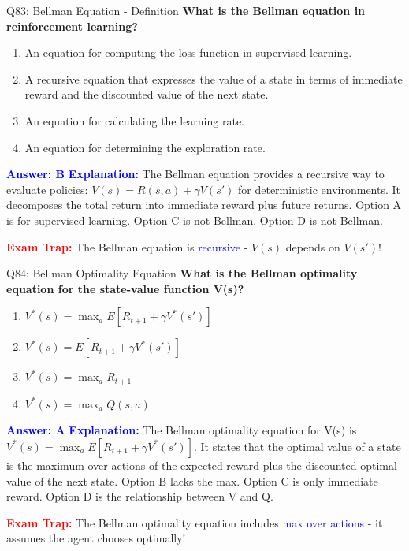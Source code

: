 \documentclass[8pt]{beamer}
\begin{document}
	\begin{frame}{Q83: Bellman Equation - Definition}
		\fontsize{6.5}{7.5}\selectfont
		\textbf{What is the Bellman equation in reinforcement learning?}
		
		\begin{enumerate}
			\item An equation for computing the loss function in supervised learning.
			\item A recursive equation that expresses the value of a state in terms of immediate reward and the discounted value of the next state.
			\item An equation for calculating the learning rate.
			\item An equation for determining the exploration rate.
		\end{enumerate}
		
		\vspace{0.1cm}
		\textcolor{blue}{\textbf{Answer: B}}
		\vspace{0.1cm}
		\textcolor{blue}{\textbf{Explanation:}} The Bellman equation provides a recursive way to evaluate policies: $V(s) = R(s,a) + \gamma V(s')$ for deterministic environments. It decomposes the total return into immediate reward plus future returns. Option A is for supervised learning. Option C is not Bellman. Option D is not Bellman.
		
		\textcolor{red}{\textbf{Exam Trap:}} The Bellman equation is \textcolor{blue}{recursive} - $V(s)$ depends on $V(s')$!
	\end{frame}
	
	\begin{frame}{Q84: Bellman Optimality Equation}
		\fontsize{6.5}{7.5}\selectfont
		\textbf{What is the Bellman optimality equation for the state-value function V(s)?}
		
		\begin{enumerate}
			\item $V^*(s) = \max_a E[R_{t+1} + \gamma V^*(s')]$
			\item $V^*(s) = E[R_{t+1} + \gamma V^*(s')]$
			\item $V^*(s) = \max_a R_{t+1}$
			\item $V^*(s) = \max_a Q(s,a)$
		\end{enumerate}
		
		\vspace{0.1cm}
		\textcolor{blue}{\textbf{Answer: A}}
		\vspace{0.1cm}
		\textcolor{blue}{\textbf{Explanation:}} The Bellman optimality equation for V(s) is $V^*(s) = \max_a E[R_{t+1} + \gamma V^*(s')]$. It states that the optimal value of a state is the maximum over actions of the expected reward plus the discounted optimal value of the next state. Option B lacks the max. Option C is only immediate reward. Option D is the relationship between V and Q.
		
		\textcolor{red}{\textbf{Exam Trap:}} The Bellman optimality equation includes \textcolor{blue}{max over actions} - it assumes the agent chooses optimally!
	\end{frame}
	
\end{document}
